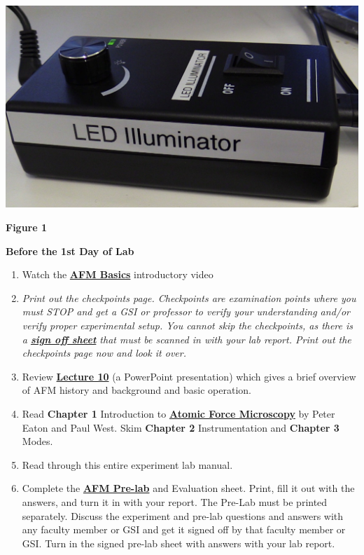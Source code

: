 \documentclass{../lab}
\begin{document}
\href{http://experimentationlab.berkeley.edu/sites/default/files/AFMImages/LED2.jpg}{\includegraphics[width=0.33\linewidth,keepaspectratio]{images/LED2.jpg}}

\textbf{Figure 1}

\textbf{Before the 1st Day of Lab }

\begin{enumerate}
    \item Watch the \href{http://experimentationlab.berkeley.edu/sites/default/files/Introduction\%20Video\_2.mp4}{\textbf{AFM Basics}} introductory video

    \item \emph{Print out the checkpoints page. Checkpoints are examination points where you must STOP and get a GSI or professor to verify your understanding and/or verify proper experimental setup. You cannot skip the checkpoints, as there is a \href{http://experimentationlab.berkeley.edu/node/136}{\textbf{sign off sheet}} that must be scanned in with your lab report. Print out the checkpoints page now and look it over.}

    \item Review \href{http://experimentationlab.berkeley.edu/sites/default/files/AFMImages/Lecture\_10\_AFM.pdf}{\textbf{Lecture 10}} (a PowerPoint presentation) which gives a brief overview of AFM history and background and basic operation.

    \item Read \textbf{Chapter 1} Introduction to \href{http://experimentationlab.berkeley.edu/afm-book}{\textbf{\textbf{Atomic Force Microscopy}}} by Peter Eaton and Paul West. Skim \textbf{Chapter 2} Instrumentation and \textbf{Chapter 3} Modes.

    \item Read through this entire experiment lab manual.

    \item Complete the \href{http://experimentationlab.berkeley.edu/node/122}{\textbf{AFM Pre-lab}} and Evaluation sheet. Print, fill it out with the answers, and turn it in with your report. The Pre-Lab must be printed separately. Discuss the experiment and pre-lab questions and answers with any faculty member or GSI and get it signed off by that faculty member or GSI. Turn in the signed pre-lab sheet with answers with your lab report.

\end{enumerate}
\end{document}
